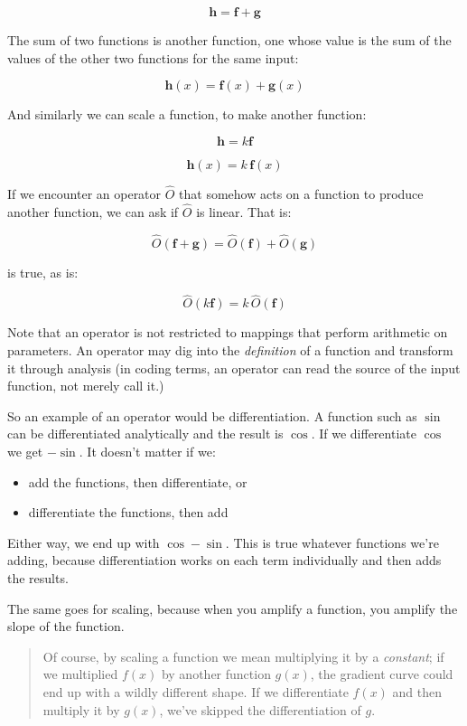 $$\mathbf{h} = \mathbf{f} + \mathbf{g}$$

The sum of two functions is another function, one whose value is the sum of the values of the other two functions for the same input:

$$\mathbf{h}(x) = \mathbf{f}(x) + \mathbf{g}(x)$$

And similarly we can scale a function, to make another function:

$$\mathbf{h} = k \mathbf{f}$$

$$\mathbf{h}(x) = k \,\mathbf{f}(x)$$

If we encounter an operator $\hat{O}$ that somehow acts on a function to produce another function, we can ask if $\hat{O}$ is linear. That is:

$$\hat{O}(\mathbf{f} + \mathbf{g}) = \hat{O}(\mathbf{f}) + \hat{O}(\mathbf{g})$$

is true, as is:

$$\hat{O}(k\mathbf{f}) = k\,\hat{O}(\mathbf{f})$$

Note that an operator is not restricted to mappings that perform arithmetic on parameters. An operator may dig into the \textit{definition} of a function and transform it through analysis (in coding terms, an operator can read the source of the input function, not merely call it.)

So an example of an operator would be differentiation. A function such as $\sin$ can be differentiated analytically and the result is $\cos$. If we differentiate $\cos$ we get $-\sin$. It doesn't matter if we:

\begin{itemize}    
    \item add the functions, then differentiate, or
    \item differentiate the functions, then add
\end{itemize}

Either way, we end up with $\cos - \sin$. This is true whatever functions we're adding, because differentiation works on each term individually and then adds the results.

The same goes for scaling, because when you amplify a function, you amplify the slope of the function.

\begin{quote}
    Of course, by scaling a function we mean multiplying it by a \textit{constant}; if we multiplied $f(x)$ by another function $g(x)$, the gradient curve could end up with a wildly different shape. If we differentiate $f(x)$ and then multiply it by $g(x)$, we've skipped the differentiation of $g$.    
\end{quote}

